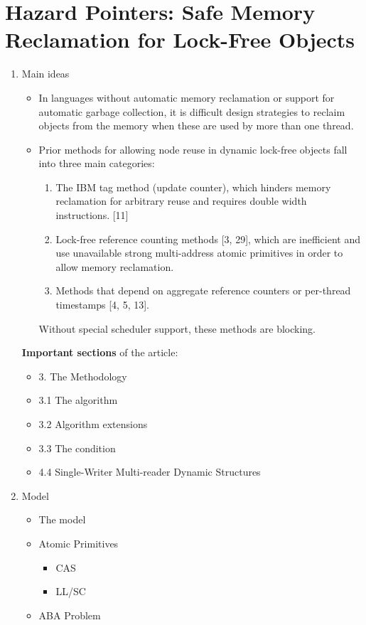 \documentclass[openany, a4paper]{book}
\theoremstyle{break}
\theoremstyle{example}
\theoremstyle{note}
\theoremstyle{break}
\theoremstyle{exercise}
\begin{document}
\section{Hazard Pointers: Safe Memory Reclamation for Lock-Free Objects}
\label{sec:org1fa9cd0}
\begin{enumerate}
\item Main ideas
\label{sec:org2122708}

\begin{itemize}
\item In languages without automatic memory reclamation or support for
automatic garbage collection, it is difficult design strategies to
reclaim objects from the memory when these are used by more than one
thread.
\item Prior methods for allowing node reuse in dynamic lock-free objects fall
into three main categories:
\begin{enumerate}
\item The IBM tag method (update counter), which hinders memory reclamation
for arbitrary reuse and requires double width instructions. [11]
\item Lock-free reference counting methods [3, 29], which are inefficient
and use unavailable strong multi-address atomic primitives in order to
allow memory reclamation.
\item Methods that depend on aggregate reference counters or per-thread
timestamps [4, 5, 13].
\end{enumerate}
Without special scheduler support, these methods are blocking.
\end{itemize}

\textbf{Important sections} of the article:

\begin{itemize}
\item 3. The Methodology
\item 3.1 The algorithm
\item 3.2 Algorithm extensions
\item 3.3 The condition
\item 4.4 Single-Writer Multi-reader Dynamic Structures
\end{itemize}

\item Model
\label{sec:orgc5333ea}

\begin{itemize}
\item The model
\item Atomic Primitives
\begin{itemize}
\item CAS
\item LL/SC
\end{itemize}
\item ABA Problem
\end{itemize}


\end{enumerate}
\end{document}
